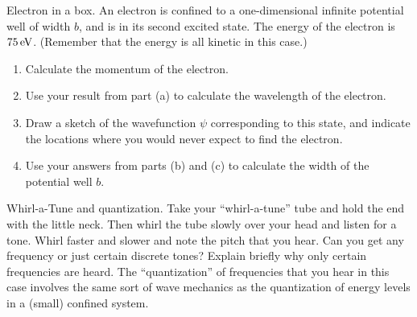 \begin{aproblem}{Electron in a box.}  
  An electron is confined to a one-dimensional infinite potential well
  of width $b$, and is in its second excited state.  The energy of the
  electron is $75\,\mbox{eV}$.  (Remember that the energy is all
  kinetic in this case.)
  \begin{enumerate}
  \item Calculate the momentum of the electron.
  \item Use your result from part (a) to calculate the wavelength of
    the electron.
  \item Draw a sketch of the wavefunction $\psi$ corresponding to this
    state, and indicate the locations where you would never expect to
    find the electron.
  \item Use your answers from parts (b) and (c) to calculate the width
    of the potential well $b$.
  \end{enumerate}
\end{aproblem}


\begin{aproblem}{Whirl-a-Tune and quantization.} 
  Take your ``whirl-a-tune'' tube and hold the end with the little
  neck.  Then whirl the tube slowly over your head and listen for a
  tone.  Whirl faster and slower and note the pitch that you hear.
  Can you get any frequency or just certain discrete tones?  Explain
  briefly why only certain frequencies are heard.  The
  ``quantization'' of frequencies that you hear in this case involves
  the same sort of wave mechanics as the quantization of energy levels
  in a (small) confined system.
\end{aproblem}

\newpage

